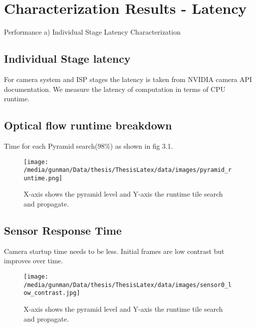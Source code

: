 	
\section{Characterization Results - Latency}

 Performance \newline
	a) Individual Stage Latency Characterization
	

\subsection{Individual Stage latency}
For camera system and ISP stages the latency is taken from NVIDIA camera API documentation. We measure the latency of computation in terms of CPU runtime. 

\subsection{Optical flow runtime breakdown}
Time for each Pyramid search(98\%) as shown in fig 3.1.
\begin{figure*}
	\begin{center}
		\texttt{[image: /media/gunman/Data/thesis/ThesisLatex/data/images/pyramid\_runtime.png]}
		\caption{X-axis shows the pyramid level and Y-axis the runtime tile search and propagate.}
		\label{fig:ex_4_9}
	\end{center}
	\vspace{-0.3in}
\end{figure*} 

\subsection{Sensor Response Time}
Camera startup time needs to be less. 
	Initial frames are low contrast but improves over time. 
	\begin{figure*}
		\begin{center}
			\texttt{[image: /media/gunman/Data/thesis/ThesisLatex/data/images/sensor0\_low\_contrast.jpg]}
			\caption{X-axis shows the pyramid level and Y-axis the runtime tile search and propagate.}
			\label{fig:ex_4_9}
		\end{center}
		\vspace{-0.3in}
	\end{figure*} 

